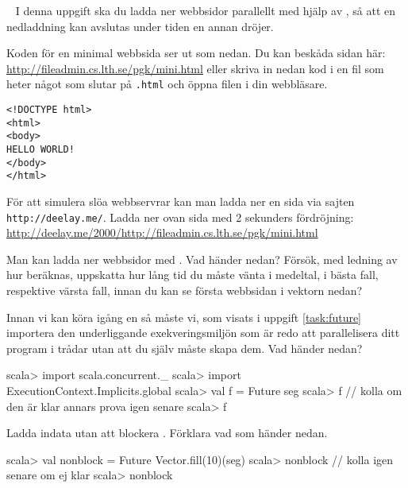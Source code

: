 \QUESTBEGIN

\Task  \what~
I denna uppgift ska du ladda ner webbsidor parallellt med hjälp av , så att en nedladdning kan avslutas under tiden en annan dröjer.

\Subtask Koden för en minimal webbsida ser ut som nedan. Du kan beskåda sidan här: \url{http://fileadmin.cs.lth.se/pgk/mini.html} eller skriva in nedan kod i en fil som heter något som slutar på \texttt{.html} och öppna filen i din webbläsare.

\begin{verbatim}
<!DOCTYPE html>
<html>
<body>
HELLO WORLD!
</body>
</html>
\end{verbatim}

\Subtask För att simulera slöa webbservrar kan man ladda ner en sida via sajten \texttt{http://deelay.me/}. Ladda ner ovan sida med 2 sekunders fördröjning:\\
\url{http://deelay.me/2000/http://fileadmin.cs.lth.se/pgk/mini.html}

\Subtask Man kan ladda ner webbsidor med . Vad händer nedan? Försök, med ledning av hur  beräknas, uppskatta hur lång tid du måste vänta i medeltal, i bästa fall, respektive värsta fall, innan du kan se första webbsidan i vektorn  nedan?


\Subtask Innan vi kan köra igång en  så måste vi, som visats i uppgift \ref{task:future} importera den underliggande exekveringsmiljön som är redo att parallelisera ditt program i trådar utan att du själv måste skapa dem. Vad händer nedan?
\begin{REPL}
scala> import scala.concurrent._
scala> import ExecutionContext.Implicits.global
scala> val f = Future{ seg }
scala> f   // kolla om den är klar annars prova igen senare
scala> f
\end{REPL}

\Subtask Ladda indata utan att blockera . Förklara vad som händer nedan.
\begin{REPL}
scala> val nonblock = Future{ Vector.fill(10)(seg) }
scala> nonblock   // kolla igen senare om ej klar
scala> nonblock
\end{REPL}

